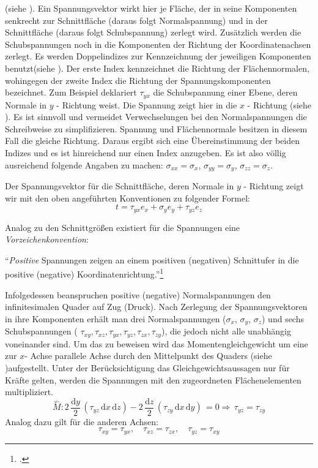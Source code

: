 \documentclass[12pt,a4paper,parskip]{scrartcl}
\begin{document}
{  (siehe ). Ein Spannungsvektor wirkt hier je Fläche, der in seine Komponenten senkrecht zur Schnittfläche (daraus folgt Normalspannung) und in der Schnittfläche (daraus folgt Schubspannung) zerlegt wird. Zusätzlich werden die Schubspannungen noch in die Komponenten der Richtung der Koordinatenachsen zerlegt. Es werden Doppelindizes zur Kennzeichnung der jeweiligen Komponenten benutzt(siehe ). 
Der erste Index kennzeichnet die Richtung der Flächennormalen, wohingegen der zweite Index die Richtung der Spannungskomponenten bezeichnet. Zum Beispiel deklariert $ \tau_{yx} $ die Schubspannung einer Ebene, deren Normale in $y$ - Richtung weist. Die Spannung zeigt hier in die $ x $ - Richtung (siehe ). Es ist sinnvoll und vermeidet Verwechselungen bei den Normalspannungen die Schreibweise zu simplifizieren. Spannung und Flächennormale besitzen in diesem Fall die gleiche Richtung. Daraus ergibt sich eine Übereinstimmung der beiden Indizes und es ist hinreichend nur einen Index anzugeben. Es ist also völlig ausreichend  folgende Angaben zu machen: $ \sigma_{xx} = \sigma_{x} $, $ \sigma_{yy} = \sigma_y $, $ \sigma_{zz} = \sigma_z $.

Der Spannungsvektor für die Schnittfläche, deren Normale in $ y $ - Richtung zeigt wir mit den oben angeführten Konventionen zu folgender Formel:
\begin{equation}
t = \tau_{yx}e_x + \sigma_ye_y + \tau_{yz}e_z
\end{equation}

Analog zu den Schnittgrößen existiert für die Spannungen eine \emph{Vorzeichenkonvention}:

"`\emph{Positive} Spannungen zeigen an einem positiven (negativen) Schnittufer in die positive (negative) Koordinatenrichtung."'\footcite[Vgl.][45]{tmr}

Infolgedessen beanspruchen positive (negative) Normalspannungen den infinitesimalen Quader auf Zug (Druck). Nach Zerlegung der Spannungsvektoren in ihre Komponenten erhält man drei Normalspannungen ($ \sigma_x$, $ \sigma_y $, $ \sigma_z $) und sechs Schubspannungen ( $ \tau_{xy}, \tau_{xz}, \tau_{yx}, \tau_{yz}, \tau_{zx}, \tau_{zy} $), die jedoch nicht alle unabhängig voneinander sind. Um das zu beweisen wird das Momentengleichgewicht um eine zur $x$- Achse parallele Achse durch den Mittelpunkt des Quaders (siehe )aufgestellt. Unter der Berücksichtigung das Gleichgewichtsaussagen nur für Kräfte gelten, werden die Spannungen mit den zugeordneten Flächenelementen multipliziert.
\begin{equation}
\overset{\curvearrowleft}{M}: 2\,\frac{\text{d}y}{2}\,(\tau_{yz}\,\text{d}x\,\text{d}z) - 2\,\frac{\text{d}z}{2}\,(\tau_{zy}\, \text{d}x\,\text{d}y)\,= 0 \Rightarrow\,\tau_{yz} = \tau_{zy}
\end{equation} Analog dazu gilt für die anderen Achsen: \begin{equation}
\tau_{xy}=\tau_{yx},\quad\tau_{xz}=\tau_{zx},\quad\tau_{yz}=\tau_{xy}
\end{equation}

}
\end{document}
